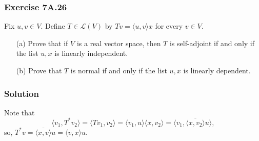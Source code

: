\subsubsection*{Exercise 7A.26}

Fix $u, v \in V$.
Define $T \in \mathcal{L}(V)$ by $Tv = \langle u, v \rangle x$ for every $v \in V$.
\begin{itemize}
    \item[(a)] Prove that if $V$ is a real vector space, then $T$ is self-adjoint if and only if the list $u, x$ is linearly independent.
    \item[(b)] Prove that $T$ is normal if and only if the list $u, x$ is linearly dependent.
\end{itemize}

\subsubsection*{Solution}

Note that
\begin{equation*}
    \langle v_1, T^* v_2 \rangle
        = \langle Tv_1, v_2 \rangle
        = \langle v_1, u \rangle \langle x, v_2 \rangle
        = \langle v_1, \overline{\langle x, v_2 \rangle} u \rangle,
\end{equation*}
so, $T^*v = \overline{\langle x, v\rangle} u = \langle v, x \rangle u$.

